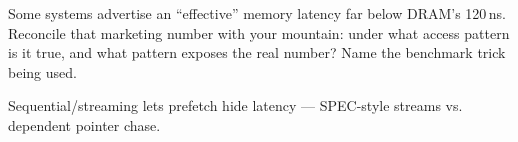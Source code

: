 \begin{exercise}[hard]
Some systems advertise an ``effective'' memory latency far below
DRAM's 120\,ns. Reconcile that marketing number with your mountain:
under what access pattern is it true, and what pattern exposes the
real number? Name the benchmark trick being used.
\end{exercise}
\begin{solution}[hint]
Sequential/streaming lets prefetch hide latency ---
SPEC-style streams vs. dependent pointer chase.
\end{solution}
